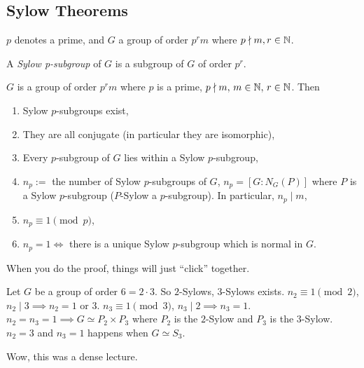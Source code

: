 \subsection{Sylow Theorems}
$p$ denotes a prime, and $G$ a group of order $p^{r}m$ where $p \nmid m, r \in \mathbb{N}$.
\begin{definition}[Sylow] %
   A \emph{Sylow p-subgroup} of $G$ is a subgroup of $G$ of order $p^{r}$. 
\end{definition}
\begin{theorem}
    $G$ is a group of order $p^{r}m$ where $p$ is a prime, $p\nmid m, \, m\in \mathbb{N}, \, r\in \mathbb{N}$. Then 
    \begin{enumerate}
        \item Sylow $p$-subgroups exist,
        \item They are all conjugate (in particular they are isomorphic),
        \item Every $p$-subgroup of $G$ lies within a Sylow $p$-subgroup,
        \item $n_p:=$ the number of Sylow $p$-subgroups of $G$, $n_p=[G:N_G(P)]$ where  $P$ is a Sylow $p$-subgroup ($P$-Sylow a $p$-subgroup). In particular, $n_p \mid m$,
        \item $n_p \equiv 1 \pmod p$,
        \item  $n_p=1 \iff $ there is a unique Sylow $p$-subgroup which is normal in $G$.
    \end{enumerate}
\end{theorem}
When you do the proof, things will just ``click'' together.
\begin{example}
   Let $G$ be a group of order $6=2\cdot 3$. So $2$-Sylows, $3$-Sylows exists. $n_2\equiv 1 \pmod 2$, $n_2 \mid 3 \implies  n_2=1$ or $3$. $n_3\equiv 1 \pmod 3$, $n_3 \mid 2 \implies n_3=1$. $n_2=n_3=1 \implies  G \simeq  P_2\times P_3$ where $P_2$ is the $2$-Sylow and $P_3$ is the $3$-Sylow. $n_2=3$ and $n_3=1$ happens when $G\simeq S_3$.
\end{example}
Wow, this was a dense lecture.


